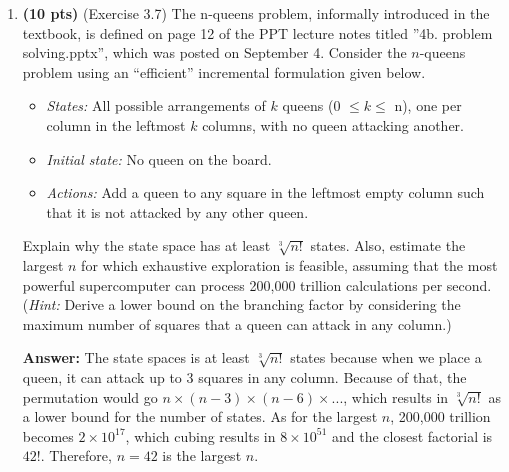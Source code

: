 \documentclass{article}
\begin{document}
\begin{enumerate}
\begin{enumerate}[label=($\alph*$)]
    
    \end{enumerate}



\item \textbf{(10 pts)} (Exercise 3.7) The n-queens problem, informally introduced in the textbook, is defined on page 12 of the PPT lecture notes titled ”4b. problem solving.pptx”, which was posted on September 4. Consider the $n$-queens problem using an “efficient” incremental formulation given below.

\begin{itemize}
    \item \textit{States:} All possible arrangements of $k$ queens (0 $\leq k \leq$ n), one per column in the leftmost $k$ columns, with no queen attacking another.
    \item \textit{Initial state:} No queen on the board.
    \item \textit{Actions:} Add a queen to any square in the leftmost empty column such that it is not attacked by any other queen.
\end{itemize}

Explain why the state space has at least $\sqrt[3]{n!}$ states. Also, estimate the largest $n$ for which exhaustive exploration is feasible, assuming that the most powerful supercomputer can process 200,000 trillion calculations per second. (\textit{Hint:} Derive a lower bound on the branching factor by considering the maximum number of squares that a queen can attack in any column.)

\color{blue}\textbf{Answer:} The state spaces is at least $\sqrt[3]{n!}$ states because when we place a queen, it can attack up to 3 squares in any column. Because of that, the permutation would go $n \times (n-3) \times (n-6) \times ...$, which results in $\sqrt[3]{n!}$ as a lower bound for the number of states. As for the largest $n$, 200,000 trillion becomes $2 \times 10^{17}$, which cubing results in $8 \times 10^{51}$ and the closest factorial is $42!$. Therefore, $n = 42$ is the largest $n$. \color{black}



\end{enumerate}
\end{document}
